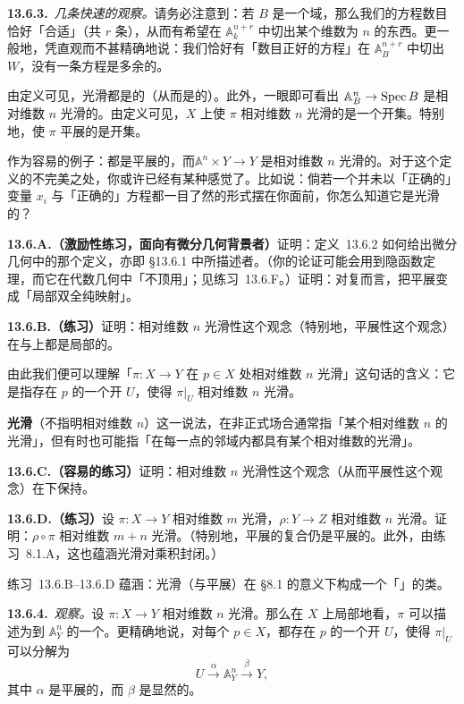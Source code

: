 \textbf{13.6.3.}\ \emph{几条快速的观察。}\quad 请务必注意到：若 $B$ 是一个域，那么我们的方程数目恰好「合适」（共 $r$ 条），从而有希望在 $\mathbb{A}^{n+r}_k$ 中切出某个维数为 $n$ 的东西。更一般地，凭直观而不甚精确地说：我们恰好有「数目正好的方程」在 $\mathbb{A}^{n+r}_B$ 中切出 $W$，没有一条方程是多余的。

由定义可见，光滑\trMorphism{}都是\trLocally\trFinitelyPresented{}的（从而是\trLocally\trFiniteType{}的）。此外，一眼即可看出 $\mathbb{A}^n_B\to\operatorname{Spec} B$ 是相对维数 $n$ 光滑的。由定义可见，$X$ 上使 $\pi$ 相对维数 $n$ 光滑的\trLocus{}是一个开集。特别地，使 $\pi$ 平展的\trLocus{}是开集。

作为容易的例子：\trOpenEmbedding{}都是平展的，而\trProjection $\mathbb{A}^n\times Y\to Y$ 是相对维数 $n$ 光滑的。对于这个定义的不完美之处，你或许已经有某种感觉了。比如说：倘若一个\trMorphism{}并未以「正确的」变量 $x_i$ 与「正确的」方程都一目了然的形式摆在你面前，你怎么知道它是光滑的？

\textbf{13.6.A.（激励性练习，面向有微分几何背景者）}\quad 证明：定义~13.6.2 如何给出微分几何中的那个定义，亦即 \S13.6.1 中所描述者。（你的论证可能会用到隐函数定理，而它在代数几何中「不顶用」；见\mbox{练习~13.6.F}。）证明：对复\trVariety{}而言，\trAnalytification{}把平展\trMorphism{}变成「局部双全纯映射」。

\textbf{13.6.B.（练习）}\quad 证明：相对维数 $n$ 光滑性这个观念（特别地，平展性这个观念）在\trSource{}与\trTarget{}上都是局部的。

由此我们便可以理解「$\pi\colon X\to Y$ 在 $p\in X$ 处相对维数 $n$ 光滑」这句话的含义：它是指存在 $p$ 的一个开\trNeighborhood{} $U$，使得 $\pi|_U$ 相对维数 $n$ 光滑。

\textbf{光滑\trMorphism}（不指明相对维数 $n$）这一说法，在非正式场合通常指「某个相对维数 $n$ 的光滑\trMorphism」，但有时也可能指「在每一点的邻域内都具有某个相对维数的光滑」。

\textbf{13.6.C.（容易的练习）}\quad 证明：相对维数 $n$ 光滑性这个观念（从而平展性这个观念）在\trBaseChange{}下保持。

\textbf{13.6.D.（练习）}\quad 设 $\pi\colon X\to Y$ 相对维数 $m$ 光滑，$\rho\colon Y\to Z$ 相对维数 $n$ 光滑。证明：$\rho\circ\pi$ 相对维数 $m+n$ 光滑。（特别地，平展\trMorphism{}的复合仍是平展的。此外，由\mbox{练习~8.1.A}，这也蕴涵光滑\trMorphism{}对乘积封闭。）

\mbox{练习~13.6.B--13.6.D} 蕴涵：光滑\trMorphism{}（与平展\trMorphism）在 \S8.1 的意义下构成一个「\trReasonable」的类。

\textbf{13.6.4.}\ \emph{观察。}\quad 设 $\pi\colon X\to Y$ 相对维数 $n$ 光滑。那么在 $X$ 上局部地看，$\pi$ 可以描述为到 $\mathbb{A}^n_Y$ 的一个\trEtale{}\trCover。更精确地说，对每个 $p\in X$，都存在 $p$ 的一个开\trNeighborhood{} $U$，使得 $\pi|_U$ 可以分解为
\[
U \xrightarrow{\ \alpha\ } \mathbb{A}^n_Y \xrightarrow{\ \beta\ } Y,
\]
其中 $\alpha$ 是平展的，而 $\beta$ 是显然的\trProjection。

